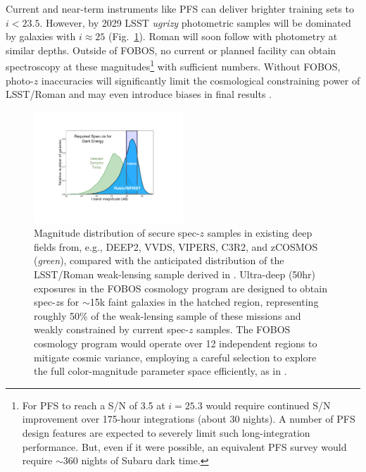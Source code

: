 \documentclass[oneside,11pt]{amsart}
\begin{document}
Current and near-term instruments like PFS can deliver brighter training sets to $i < 23.5$.  However, by 2029 LSST \textit{ugrizy} photometric samples will be dominated by galaxies with $i \approx 25$ (Fig.~\ref{fig:cosmos_magdist}).  Roman will soon follow with photometry at similar depths.  Outside of FOBOS, no current or planned facility can obtain spectroscopy at these magnitudes\footnote{For PFS to reach a S/N of 3.5 at $i = 25.3$ would require continued S/N improvement over 175-hour integrations (about 30 nights).  A number of PFS design features are expected to severely  limit such long-integration performance.  But, even if it were possible, an equivalent PFS survey would require $\sim$360 nights of Subaru dark time.} with sufficient numbers.  Without FOBOS, photo-$z$ inaccuracies will significantly limit the cosmological constraining power of LSST/Roman and may even introduce biases in final results \citep{huterer06, LSSTDESCSRD}.  




\begin{figure}%
\vspace{-0.2cm}
\includegraphics[width=0.5\textwidth]{figs/fobos_cosmology_v2.pdf}
\caption{\footnotesize Magnitude distribution of secure spec-$z$ samples in existing deep fields from, e.g., DEEP2, VVDS, VIPERS, C3R2, and zCOSMOS ({\it green}), compared with the anticipated distribution of the LSST/Roman weak-lensing sample derived in \citet[][{\it blue}]{hemmati18}. Ultra-deep (50hr) exposures in the FOBOS cosmology program are designed to obtain spec-$z$s for $\sim$15k faint galaxies in the hatched region, representing roughly 50\% of the weak-lensing sample of these missions and weakly constrained by current spec-$z$ samples. The FOBOS cosmology program would operate over 12 independent regions to mitigate cosmic variance, employing a careful selection to explore the full color-magnitude parameter space efficiently, as in \cite{masters15}.}
\label{fig:cosmos_magdist}
\end{figure}
\end{document}
